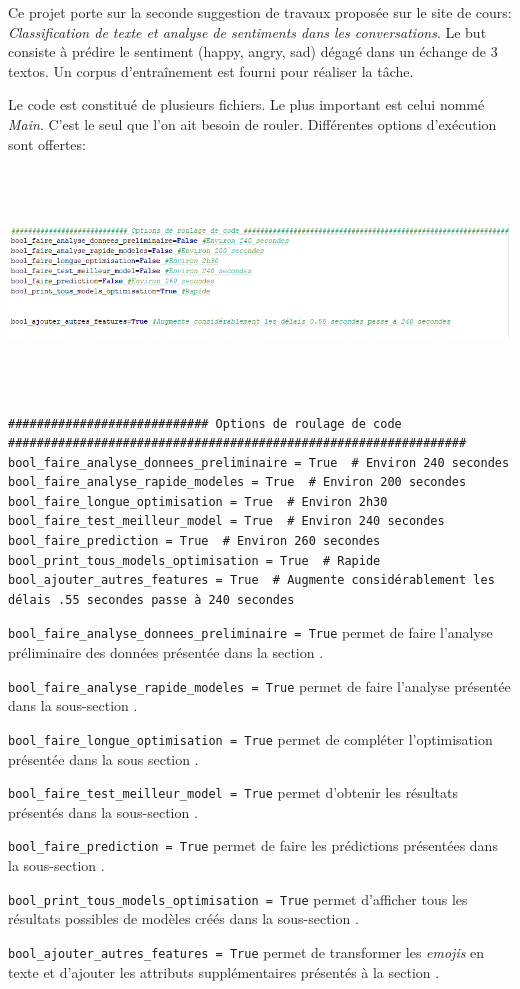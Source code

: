 Ce projet porte sur la seconde suggestion de travaux proposée sur le site de cours: \emph{ Classification de texte et analyse de sentiments dans les conversations}. Le but consiste à prédire le sentiment (happy, angry, sad) dégagé dans un échange de 3 textos. Un corpus d'entraînement est fourni pour réaliser la tâche. 

Le code est constitué de plusieurs fichiers. Le plus important est celui nommé \emph{Main}. C'est le seul que l'on ait besoin de rouler. Différentes options d'exécution sont offertes:

\includegraphics[width=\linewidth,height=6cm]{images/list_bool}

\begin{lstlisting}
############################ Options de roulage de code ################################################################
bool_faire_analyse_donnees_preliminaire = True  # Environ 240 secondes
bool_faire_analyse_rapide_modeles = True  # Environ 200 secondes
bool_faire_longue_optimisation = True  # Environ 2h30
bool_faire_test_meilleur_model = True  # Environ 240 secondes
bool_faire_prediction = True  # Environ 260 secondes
bool_print_tous_models_optimisation = True  # Rapide
bool_ajouter_autres_features = True  # Augmente considérablement les délais .55 secondes passe à 240 secondes
\end{lstlisting}

\verb|bool_faire_analyse_donnees_preliminaire = True| permet de faire l'analyse préliminaire des données présentée dans la section . 

\verb|bool_faire_analyse_rapide_modeles = True| permet de faire l'analyse présentée dans la sous-section . 

\verb|bool_faire_longue_optimisation = True| permet de compléter l'optimisation présentée dans la sous section . 

\verb|bool_faire_test_meilleur_model = True| permet d'obtenir les résultats présentés dans la sous-section . 

\verb|bool_faire_prediction = True| permet de faire les prédictions présentées dans la sous-section . 

\verb|bool_print_tous_models_optimisation = True| permet d'afficher tous les résultats possibles de modèles créés dans la sous-section .

\verb|bool_ajouter_autres_features = True| permet de transformer les \emph{emojis} en texte et d'ajouter les attributs supplémentaires présentés à la section .